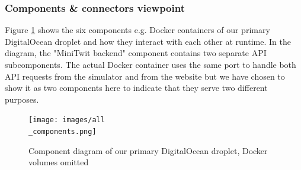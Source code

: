 \subsubsection{Components \& connectors viewpoint}
Figure \ref{fig:CompleteComponentDiagram} shows the six components e.g. Docker containers of our primary DigitalOcean droplet and how they interact with each other at runtime. In the diagram, the "MiniTwit backend" component contains two separate API subcomponents. The actual Docker container uses the same port to handle both API requests from the simulator and from the website but we have chosen to show it as two components here to indicate that they serve two different purposes.
\begin{figure}[H]
 \centering
 \texttt{[image: images/all\\\_components.png]}
 \caption{Component diagram of our primary DigitalOcean droplet, Docker volumes omitted}
 \label{fig:CompleteComponentDiagram}
\end{figure}
